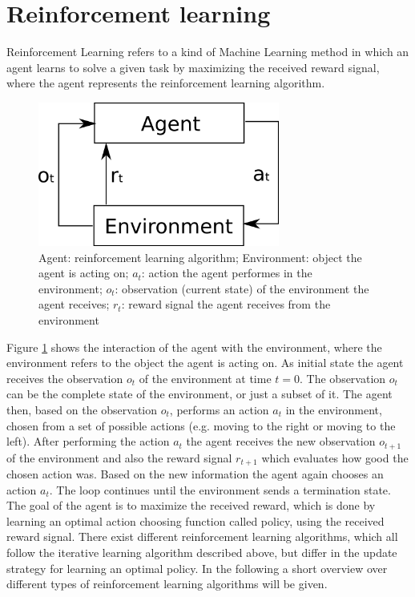 \section{Reinforcement learning}

Reinforcement Learning refers to a kind of Machine Learning method in which an agent learns to solve a given task by maximizing the received reward signal, where the agent represents the reinforcement learning algorithm.\\


\begin{figure}[H]
  \centering
  \includegraphics[width=300px]{Images/rl_agent.png} 
  \caption{Agent: reinforcement learning algorithm; Environment: object the agent is acting on; $a_t$: action the agent performes in the environment; $o_t$: observation (current state) of the environment the agent receives; $r_t$: reward signal the agent receives from the environment}
  \label{fig:reinforcement_learning}
\end{figure}


Figure \ref{fig:reinforcement_learning} shows the interaction of the agent with the environment, where the environment refers to the object the agent is acting on. As initial state the agent receives the observation $o_t$ of the environment at time $t = 0$. The observation $o_t$ can be the complete state of the environment, or just a subset of it.
The agent then, based on the observation $o_t$, performs an action $a_t$ in the environment, chosen from a set of possible actions (e.g. moving to the right or moving to the left). After performing the action $a_t$ the agent receives the new observation $o_{t+1}$ of the environment and also the reward signal $r_{t+1}$ which evaluates how good the chosen action was.
Based on the new information the agent again chooses an action $a_t$. The loop continues until the environment sends a termination state.\\

The goal of the agent is to maximize the received reward, which is done by learning an optimal action choosing function called policy, using the received reward signal.
There exist different reinforcement learning algorithms, which all follow the iterative learning algorithm described above, but differ in the update strategy for learning an optimal policy. In the following a short overview over different types of reinforcement learning algorithms will be given.\\

